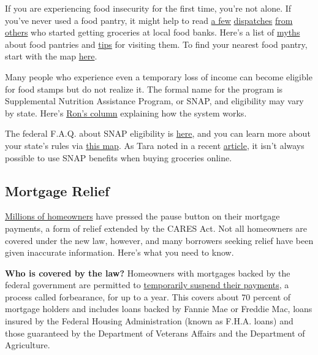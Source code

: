 If you are experiencing food insecurity for the first time, you're not
alone. If you've never used a food pantry, it might help to read
\href{https://medium.com/wake-up-call/i-went-to-the-food-bank-for-the-first-time-37450c89b959}{a
few}
\href{https://workingclassstudies.wordpress.com/2011/12/05/a-visit-to-the-food-pantry/}{dispatches}
\href{https://www.npr.org/sections/thesalt/2019/06/30/735881297/opinion-being-hungry-in-america-is-hard-work-food-banks-need-your-help}{from
others} who started getting groceries at local food banks. Here's a list
of
\href{https://solvehungertoday.org/blog/visiting-food-pantry-myths-facts/}{myths}
about food pantries and
\href{https://extension.sdstate.edu/tips-visiting-food-pantry}{tips} for
visiting them. To find your nearest food pantry, start with the map
\href{https://ampleharvest.org/find-pantry/}{here}.

Many people who experience even a temporary loss of income can become
eligible for food stamps but do not realize it. The formal name for the
program is Supplemental Nutrition Assistance Program, or SNAP, and
eligibility may vary by state. Here's
\href{https://www.nytimes3xbfgragh.onion/2020/07/17/your-money/food-stamps-coronavirus.html}{Ron's
column} explaining how the system works.

The federal F.A.Q. about SNAP eligibility is
\href{https://www.fns.usda.gov/snap/recipient/eligibility}{here}, and
you can learn more about your state's rules via
\href{https://www.fns.usda.gov/snap/state-directory}{this map}. As Tara
noted in a recent
\href{https://www.nytimes3xbfgragh.onion/2020/05/01/your-money/food-stamps-snap-coronavirus.html}{article},
it isn't always possible to use SNAP benefits when buying groceries
online.

\hypertarget{mortgage-relief}{%
\subsection{Mortgage Relief}\label{mortgage-relief}}

\href{https://www.nytimes3xbfgragh.onion/2020/05/15/business/coronavirus-mortgage-relief.html}{Millions
of homeowners} have pressed the pause button on their mortgage payments,
a form of relief extended by the CARES Act. Not all homeowners are
covered under the new law, however, and many borrowers seeking relief
have been given inaccurate information. Here's what you need to know.

\textbf{Who is covered by the law?} Homeowners with mortgages backed by
the federal government are permitted to
\href{https://www.fhfa.gov/Homeownersbuyer/MortgageAssistance/Pages/Coronavirus-Assistance-Information.aspx}{temporarily
suspend their payments}, a process called forbearance, for up to a year.
This covers about 70 percent of mortgage holders and includes loans
backed by Fannie Mae or Freddie Mac, loans insured by the Federal
Housing Administration (known as F.H.A. loans) and those guaranteed by
the Department of Veterans Affairs and the Department of Agriculture.

